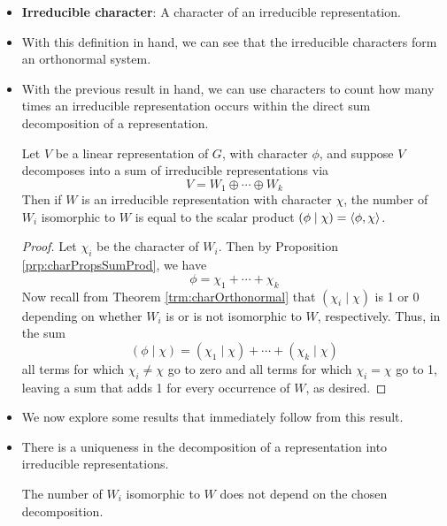 \documentclass[../notes.tex]{subfiles}
\begin{document}
\begin{itemize}
\begin{theorem}
    \end{theorem}
    \item \textbf{Irreducible character}: A character of an irreducible representation.
    \item With this definition in hand, we can see that the irreducible characters form an orthonormal system.
    \item With the previous result in hand, we can use characters to count how many times an irreducible representation occurs within the direct sum decomposition of a representation.
    \begin{theorem}
        Let $V$ be a linear representation of $G$, with character $\phi$, and suppose $V$ decomposes into a sum of irreducible representations via
        \begin{equation*}
            V = W_1\oplus\cdots\oplus W_k
        \end{equation*}
        Then if $W$ is an irreducible representation with character $\chi$, the number of $W_i$ isomorphic to $W$ is equal to the scalar product $(\phi\mid\chi)=\left\langle{\phi,\chi}\right\rangle$.
        \begin{proof}
            Let $\chi_i$ be the character of $W_i$. Then by Proposition \ref{prp:charPropsSumProd}, we have
            \begin{equation*}
                \phi = \chi_1+\cdots+\chi_k
            \end{equation*}
            Now recall from Theorem \ref{trm:charOrthonormal} that $(\chi_i\mid\chi)$ is 1 or 0 depending on whether $W_i$ is or is not isomorphic to $W$, respectively. Thus, in the sum
            \begin{equation*}
                (\phi\mid\chi) = (\chi_1\mid\chi)+\cdots+(\chi_k\mid\chi)
            \end{equation*}
            all terms for which $\chi_i\neq\chi$ go to zero and all terms for which $\chi_i=\chi$ go to 1, leaving a sum that adds 1 for every occurrence of $W$, as desired.
        \end{proof}
    \end{theorem}
    \item We now explore some results that immediately follow from this result.
    \item There is a uniqueness in the decomposition of a representation into irreducible representations.
    \setcounter{corollary}{0}
    \begin{corollary}
        The number of $W_i$ isomorphic to $W$ does not depend on the chosen decomposition.

\end{corollary}
\end{itemize}
\end{document}
